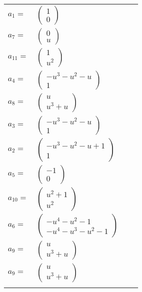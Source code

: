 \documentclass[1p]{elsarticle_modified}
\theoremstyle{definition}
\begin{document}
\begin{tabular}{m{7pt} m{180pt} m{7pt} m{180pt} }
\flushright $a_{1}=$&$\begin{pmatrix}1\\0\end{pmatrix}$ \\
\flushright $a_{7}=$&$\begin{pmatrix}0\\u\end{pmatrix}$ \\
\flushright $a_{11}=$&$\begin{pmatrix}1\\u^2\end{pmatrix}$ \\
\flushright $a_{4}=$&$\begin{pmatrix}- u^3- u^2- u\\1\end{pmatrix}$ \\
\flushright $a_{8}=$&$\begin{pmatrix}u\\u^3+u\end{pmatrix}$ \\
\flushright $a_{3}=$&$\begin{pmatrix}- u^3- u^2- u\\1\end{pmatrix}$ \\
\flushright $a_{2}=$&$\begin{pmatrix}- u^3- u^2- u+1\\1\end{pmatrix}$ \\
\flushright $a_{5}=$&$\begin{pmatrix}-1\\0\end{pmatrix}$ \\
\flushright $a_{10}=$&$\begin{pmatrix}u^2+1\\u^2\end{pmatrix}$ \\
\flushright $a_{6}=$&$\begin{pmatrix}- u^4- u^2-1\\- u^4- u^3- u^2-1\end{pmatrix}$ \\
\flushright $a_{9}=$&$\begin{pmatrix}u\\u^3+u\end{pmatrix}$\\ \flushright $a_{9}=$&$\begin{pmatrix}u\\u^3+u\end{pmatrix}$\\&\end{tabular}
\end{document}
